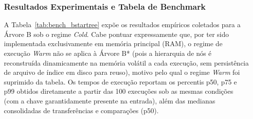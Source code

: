 \documentclass[12pt,a4paper]{article}
\begin{document}
\subsubsection{Resultados Experimentais e Tabela de Benchmark}
A Tabela~\ref{tab:bench_bstartree} expõe os resultados empíricos coletados para a Árvore B\* sob o regime \textit{Cold}. Cabe pontuar expressamente que, por ter sido implementada exclusivamente em memória principal (RAM), o regime de execução \textit{Warm} não se aplica à Árvore B* (pois a hierarquia de nós é reconstruída dinamicamente na memória volátil a cada execução, sem persistência de arquivo de índice em disco para reuso), motivo pelo qual o regime \textit{Warm} foi suprimido da tabela. Os tempos de execução reportam os percentis p50, p75 e p99 obtidos diretamente a partir das 100 execuções sob as mesmas condições (com a chave garantidamente presente na entrada), além das medianas consolidadas de transferências e comparações (p50).
\end{document}
